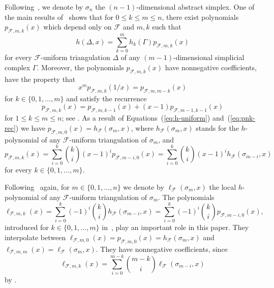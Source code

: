 \documentclass[11pt]{amsart}
\newcommand{\fF}{{\mathcal F}}
\begin{document}
Following~\cite{Ath22}, we denote by $\sigma_n$ 
the $(n-1)$-dimensional abstract simplex. One of the
main results of~\cite{Ath22} shows that for $0 \le 
k \le m \le n$, there exist polynomials 
$p_{\fF,m,k}(x)$ which depend only on $\fF$ and 
$m,k$ such that 
%
\begin{equation} \label{eq:h-uniform}
h(\Delta,x) = \sum_{k=0}^m h_k(\Gamma)  
                        p_{\fF,m,k}(x) 
\end{equation}
%
for every $\fF$-uniform triangulation $\Delta$ 
of any $(m-1)$-dimensional simplicial complex 
$\Gamma$. Moreover, the polynomials $p_{\fF,m,k}(x)$ 
have nonnegative coefficients, have the property 
that 
%
\begin{equation} \label{eq:pnk-recip}
x^m p_{\fF,m,k}(1/x) = p_{\fF,m,m-k}(x)
\end{equation}
%
for $k \in \{0, 1,\dots,m\}$ and satisfy the 
recurrence 
%
\begin{equation} \label{eq:pnk-rec}
p_{\fF,m,k}(x) = p_{\fF,m,k-1}(x) + (x-1) 
p_{\fF,m-1,k-1}(x)
\end{equation}
%
for $1 \le k \le m \le n$; see 
\cite[Section~6]{Ath22}. As a result of 
Equations~(\ref{eq:h-uniform}) 
and~(\ref{eq:pnk-rec}) we have $p_{\fF,m,0}(x) = 
h_\fF(\sigma_m,x)$, where $h_\fF(\sigma_m,x)$ 
stands for the $h$-polynomial of any 
$\fF$-uniform triangulation of $\sigma_m$, and  
%
\begin{equation} \label{eq:pnk}
p_{\fF,m,k}(x) = \sum_{i=0}^k {k \choose i} 
                 (x-1)^i p_{\fF,m-i,0}(x)
							 = \sum_{i=0}^k {k \choose i} 
                 (x-1)^i h_\fF(\sigma_{m-i},x)
\end{equation}
%
for every $k \in \{0, 1,\dots,m\}$.

Following~\cite{Ath22} again, for $m \in 
\{0, 1,\dots,n\}$ we denote by $\ell_\fF(\sigma_m,x)$ 
the local $h$-polynomial of any $\fF$-uniform 
triangulation of $\sigma_m$. The polynomials
%
\begin{equation} \label{eq:lnk-def}
\ell_{\fF,m,k}(x) = \sum_{i=0}^k (-1)^i {k \choose i}
                      h_\fF(\sigma_{m-i},x)
									= \sum_{i=0}^k (-1)^i {k \choose i}
                      p_{\fF,m-i,0}(x),
\end{equation}
%
introduced for $k \in \{0, 1,\dots,m\}$
in~\cite[Section~5.3]{Ath23+}, play an important role
in this paper. They interpolate between $\ell_{\fF,m,0}
(x) = p_{\fF,m,0}(x) = h_\fF(\sigma_m,x)$ and 
$\ell_{\fF,m,m}(x) = \ell_\fF(\sigma_m,x)$. They have
nonnegative coefficients, since 
%
\begin{equation} \label{eq:lnk-alt}
\ell_{\fF,m,k}(x) = \sum_{i=0}^{m-k} {m-k \choose i} 
                    \ell_\fF(\sigma_{m-i},x)
\end{equation}
%
by \cite[Remark~6.2~(c)]{Ath23+}.
\end{document}
